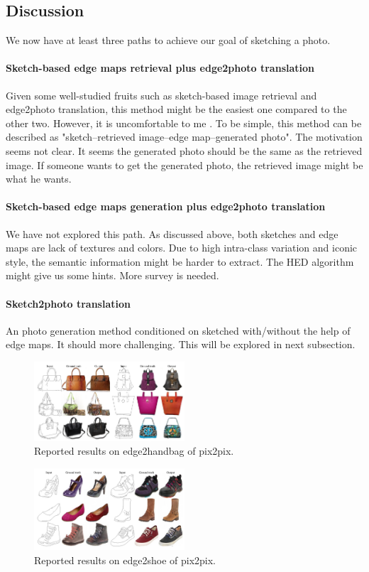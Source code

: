 \subsection{Discussion}
We now have at least three paths to achieve our goal of sketching a photo. 
\paragraph{Sketch-based edge maps retrieval plus edge2photo translation}
Given some well-studied fruits such as sketch-based image retrieval and edge2photo translation, this method might be the easiest one compared to the other two. However, it is uncomfortable to me .
To be simple, this method can be described as "sketch--retrieved image--edge map--generated photo". 
The motivation seems not clear. It seems the generated photo should be the same as the retrieved image. If someone wants to get the generated photo, the retrieved image might be what he wants. 
\paragraph{Sketch-based edge maps generation plus edge2photo translation}
We have not explored this path. As discussed above, both sketches and edge maps are lack of textures and colors. Due to high intra-class variation and iconic style, the semantic information might be harder to extract. The HED algorithm might give us some hints. More survey is needed.
\paragraph{Sketch2photo translation}
An photo generation method conditioned on sketched with/without the help of edge maps. It should more challenging. This will be explored in next subsection.



\begin{figure}
	\includegraphics[width=0.5\textwidth]{figures/pix2pix/reported_edge2handbag}
	\caption{\label{pix2pix_edge2handbag}Reported results on edge2handbag of pix2pix.}
\end{figure}
\begin{figure}
	\includegraphics[width=0.5\textwidth]{figures/pix2pix/reported_edge2shoe}
	\caption{\label{pix2pix_edge2shoe}Reported results on edge2shoe of pix2pix.}
\end{figure}

